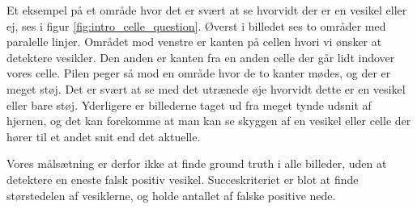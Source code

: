 Et eksempel på et område hvor det er svært at se hvorvidt der er en vesikel eller ej, ses i figur \ref{fig:intro_celle_question}. Øverst i billedet ses to områder med paralelle linjer. Området mod venstre er kanten på cellen hvori vi ønsker at detektere vesikler. Den anden er kanten fra en anden celle der går lidt indover vores celle. Pilen peger så mod en område hvor de to kanter mødes, og der er meget støj. Det er svært at se med det utrænede øje hvorvidt dette er en vesikel eller bare støj. Yderligere er billederne taget ud fra meget tynde udsnit af hjernen, og det kan forekomme at man kan se skyggen af en vesikel eller celle der hører til et andet snit end det aktuelle.  

Vores målsætning er derfor ikke at finde ground truth i alle billeder, uden at detektere en eneste falsk positiv vesikel. Succeskriteriet er blot at finde størstedelen af vesiklerne, og holde antallet af falske positive nede.   



